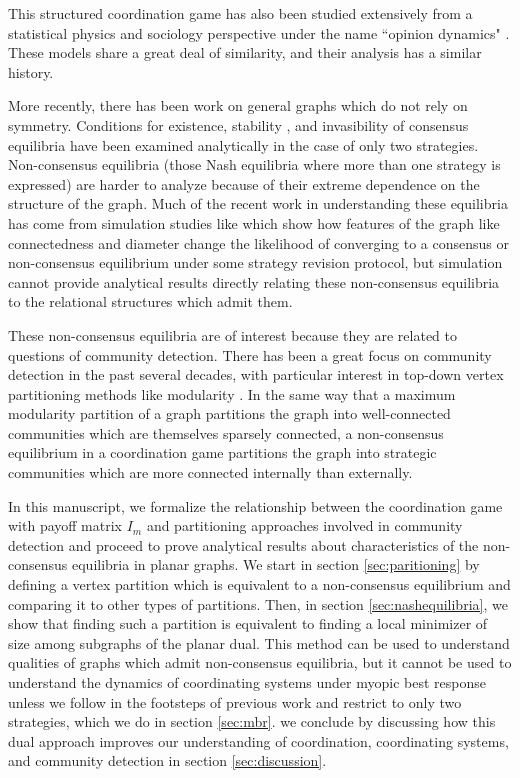 \documentclass{article}
\begin{document}
This structured coordination game has also been studied extensively from a statistical physics and sociology perspective under the name ``opinion dynamics" \citep{Degroot1974,friedkin1990social}. These models share a great deal of similarity, and their analysis has a similar history.  

More recently, there has been work on general graphs which do not rely on symmetry. Conditions for existence, stability \citep{Arditti2024}, and invasibility \cite{Paarporn2021} of consensus equilibria have been examined analytically in the case of only two strategies. Non-consensus equilibria (those Nash equilibria where more than one strategy is expressed) are harder to analyze because of their extreme dependence on the structure of the graph. Much of the recent work in understanding these equilibria has come from simulation studies like \cite{Buskens2016,Tomassini2010,McAlister2024simulation} which show how features of the graph like connectedness and diameter change the likelihood of converging to a consensus or non-consensus equilibrium under some strategy revision protocol, but simulation cannot provide analytical results directly relating these non-consensus equilibria to the relational structures which admit them. 

These non-consensus equilibria are of interest because they are related to questions of community detection. There has been a great focus on community detection in the past several decades, with particular interest in top-down vertex partitioning methods like modularity \cite{Clauset2004,Newman2006}. In the same way that a maximum modularity partition of a graph partitions the graph into well-connected communities which are themselves sparsely connected, a non-consensus equilibrium in a coordination game partitions the graph into strategic communities which are more connected internally than externally. 

In this manuscript, we formalize the relationship between the coordination game with payoff matrix $I_m$ and partitioning approaches involved in community detection and proceed to prove analytical results about characteristics of the non-consensus equilibria in planar graphs. We start in section \ref{sec:paritioning} by defining a vertex partition which is equivalent to a non-consensus equilibrium and comparing it to other types of partitions. Then, in section \ref{sec:nashequilibria}, we show that finding such a partition is equivalent to finding a local minimizer of size among subgraphs of the planar dual.  This method can be used to understand qualities of graphs which admit non-consensus equilibria, but it cannot be used to understand the dynamics of coordinating systems under myopic best response unless we follow in the footsteps of previous work and restrict to only two strategies, which we do in section \ref{sec:mbr}. we conclude by discussing how this dual approach improves our understanding of coordination, coordinating systems, and community detection in section \ref{sec:discussion}.
\end{document}
